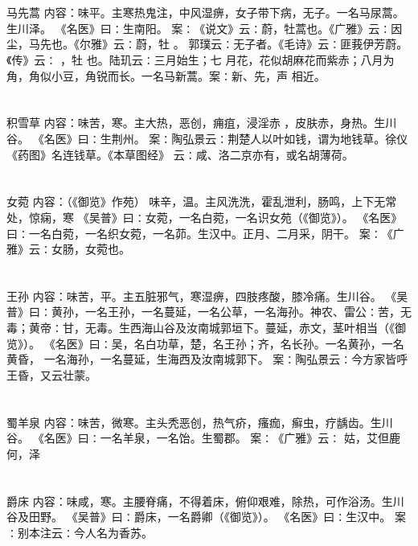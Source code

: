 \documentclass[12pt,UTF8]{ctexbook}
\begin{document}
\section{}马先蒿
内容：味平。主寒热鬼注，中风湿痹，女子带下病，无子。一名马尿蒿。生川泽。 
《名医》曰∶生南阳。 
案∶《说文》云∶蔚，牡蒿也。《广雅》云∶因尘，马先也。《尔雅》云∶蔚，牡 。 
郭璞云∶无子者。《毛诗》云∶匪莪伊芳蔚。《传》云∶ ，牡 也。陆玑云∶三月始生；七 
月花，花似胡麻花而紫赤；八月为角，角似小豆，角锐而长。一名马新蒿。案∶新、先，声 
相近。 


\section{}积雪草
内容：味苦，寒。主大热，恶创，痈疽，浸淫赤 ，皮肤赤，身热。生川谷。 
《名医》曰∶生荆州。 
案∶陶弘景云∶荆楚人以叶如钱，谓为地钱草。徐仪《药图》名连钱草。《本草图经》 
云∶咸、洛二京亦有，或名胡薄荷。 


\section{}女菀
内容：（《御览》作苑） 
味辛，温。主风洗洗，霍乱泄利，肠鸣，上下无常处，惊痫，寒 
《吴普》曰∶女菀，一名白菀，一名识女苑（《御览》）。 
《名医》曰∶一名白菀，一名织女菀，一名茆。生汉中。正月、二月采，阴干。 
案∶《广雅》云∶女肠，女菀也。 


\section{}王孙
内容：味苦，平。主五脏邪气，寒湿痹，四肢疼酸，膝冷痛。生川谷。 
《吴普》曰∶黄孙，一名王孙，一名蔓延，一名公草，一名海孙。神农、雷公∶苦，无 
毒；黄帝∶甘，无毒。生西海山谷及汝南城郭垣下。蔓延，赤文，茎叶相当（《御览》）。 
《名医》曰∶吴，名白功草，楚，名王孙；齐，名长孙。一名黄孙，一名黄昏， 
一名海孙，一名蔓延，生海西及汝南城郭下。 
案∶陶弘景云∶今方家皆呼王昏，又云壮蒙。 


\section{}蜀羊泉
内容：味苦，微寒。主头秃恶创，热气疥，瘙痂，癣虫，疗龋齿。生川谷。 
《名医》曰∶一名羊泉，一名饴。生蜀郡。 
案∶《广雅》云∶ 姑，艾但鹿何，泽 


\section{}爵床
内容：味咸，寒。主腰脊痛，不得着床，俯仰艰难，除热，可作浴汤。生川谷及田野。 
《吴普》曰∶爵床，一名爵卿（《御览》）。 
《名医》曰∶生汉中。 
案∶别本注云∶今人名为香苏。 
\end{document}
